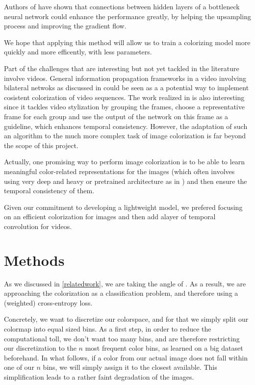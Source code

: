 \documentclass[10pt,twocolumn,letterpaper]{article}
\begin{document}
Authors of \cite{ronneberger2015unet} have shown that connections between hidden layers of a bottleneck neural network could enhance the performance greatly, by helping the upsampling process and improving the gradient flow.

We hope that applying this method will allow us to train a colorizing model more quickly and more efficently, with less parameters.

Part of the challenges that are interesting but not yet tackled in the literature involve videos. General information propagation frameworks in a video involving bilateral netwoks as discussed in \cite{jampani2017video} could be seen as a a potential way to implement cosistent colorization of video sequences. The work realized in \cite{zhu2017video} is also interesting since it tackles video stylization by grouping the frames, choose a representative frame for each group and use the output of the network on this frame as a guideline, which enhances temporal consistency. However, the adaptation of such an algorithm to the much more complex task of image colorization is far beyond the scope of this project.

Actually, one promising way to perform image colorization is to be able to learn meaningful color-related representations for the images (which often involves using very deep and heavy or pretrained architecture as in \cite{larsson2016repres}) and then ensure the temporal consistency of them.

Given our commitment to developing a lightweight model, we prefered focusing on an efficient colorization for images and then add alayer of temporal convolution for videos.


\section{Methods}

As we discussed in \ref{relatedwork}, we are taking the angle of \cite{zhang2016colorful}. As a result, we are approaching the colorization as a classification problem, and therefore using a (weighted) cross-entropy loss.

Concretely, we want to discretize our colorspace, and for that we simply split our colormap into equal sized bins. As a first step, in order to reduce the computational toll, we don't want too many bins, and are therefore restricting our discretization to the $n$ most frequent color bins, as learned on a big dataset beforehand. In what follows, if a color from our actual image does not fall within one of our $n$ bins, we will simply assign it to the closest available. This simplification leads to a rather faint degradation of the images.
\end{document}
